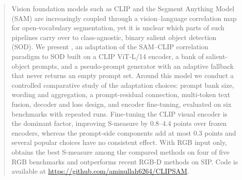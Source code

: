 \begin{abstract}
\begin{revpar}
Vision foundation models such as CLIP and the Segment Anything Model (SAM) are
increasingly coupled through a vision--language correlation map for
open-vocabulary segmentation, yet it is unclear which parts of such pipelines
carry over to class-agnostic, binary salient object detection (SOD). We present
\methodname{}, an adaptation of the SAM--CLIP correlation paradigm to SOD built on
a CLIP ViT-L/14 encoder, a bank of salient-object prompts, and a pseudo-prompt
generator with an adaptive fallback that never returns an empty prompt set.
Around this model we conduct a controlled comparative study of the adaptation
choices: prompt bank size, wording and aggregation, a prompt-residual connection,
multi-token text fusion, decoder and loss design, and encoder fine-tuning,
evaluated on six benchmarks with repeated runs. Fine-tuning the CLIP visual encoder
is the dominant factor, improving S-measure by $0.8$--$4.4$ points over frozen
encoders, whereas the prompt-side components add at most $0.3$ points and several
popular choices have no consistent effect. With RGB input only, \methodname{}
obtains the best S-measure among the compared methods on four of five RGB
benchmarks and outperforms recent RGB-D methods on SIP. Code is available at
\url{https://github.com/aminullah6264/CLIPSAM}.
\end{revpar}
\end{abstract}
